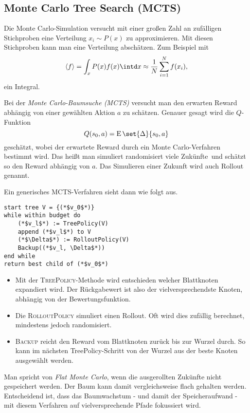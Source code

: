 \documentclass[ngerman]{../LaTeX-Templates/Paper/paper}
\newcommand{\E}{\ensuremath{\operatorname{E}}}
\begin{document}
\subsection{Monte Carlo Tree Search (MCTS)}
Die Monte Carlo-Simulation versucht mit einer großen Zahl an zufälligen Stichproben eine Verteilung $x_i\sim P(x)$ zu approximieren. Mit diesen Stichproben kann man eine Verteilung abschätzen. Zum Beispiel mit 
\begin{equation*}
	\langle f\rangle=\int_xP(x)f(x)\intd x\approx \frac1N\sum_{i=1}^Nf(x_i),
\end{equation*}
ein Integral.

Bei der \emph{Monte Carlo-Baumsuche (MCTS)} versucht man den erwarten Reward abhängig von einer gewählten Aktion $a$ zu schätzen. Genauer gesagt wird die $Q$-Funktion 
\begin{equation*}
	Q(s_0,a)=\E\set{\Delta}{s_0,a}
\end{equation*}
geschätzt, wobei der erwartete Reward durch ein Monte Carlo-Verfahren bestimmt wird. Das heißt man simuliert randomisiert viele \glqq Zukünfte\grqq\ und schätzt so den Reward abhängig von $a$. Das Simulieren einer Zukunft wird auch Rollout genannt.

Ein generisches MCTS-Verfahren sieht dann wie folgt aus.
\begin{lstlisting}
start tree V = {(*$v_0$*)}
while within budget do
	(*$v_l$*) := TreePolicy(V)
	append (*$v_l$*) to V
	(*$\Delta$*) := RolloutPolicy(V)
	Backup((*$v_l, \Delta$*))
end while
return best child of (*$v_0$*)
\end{lstlisting}

\begin{itemize}
	\item Mit der \textsc{TreePolicy}-Methode wird entschieden welcher Blattknoten expandiert wird. Der Rückgabewert ist also der vielversprechendste Knoten, abhängig von der Bewertungsfunktion.
	\item Die \textsc{RolloutPolicy} simuliert einen Rollout. Oft wird dies zufällig berechnet, mindestens jedoch randomisiert.
	\item \textsc{Backup} reicht den Reward vom Blattknoten zurück bis zur Wurzel durch. So kann im nächsten TreePolicy-Schritt von der Wurzel aus der beste Knoten ausgewählt werden. 
\end{itemize}
Man spricht von \emph{Flat Monte Carlo}, wenn die ausgerollten Zukünfte nicht gespeichert werden. Der Baum kann damit vergleichsweise flach gehalten werden. Entscheidend ist, dass das Baumwachstum - und damit der Speicheraufwand - mit diesem Verfahren auf vielversprechende Pfade fokussiert wird.
\end{document}
